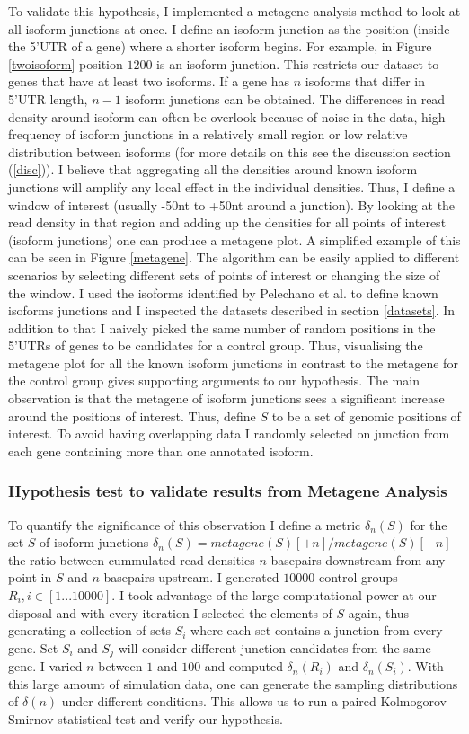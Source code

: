 \documentclass[12pt]{article}
\begin{document}
To validate this hypothesis, I implemented a metagene analysis method to look at all isoform junctions at once. I define an isoform junction as the position (inside the 5'UTR of a gene) where a shorter isoform begins. For example, in Figure \ref{twoisoform} position $1200$ is an isoform junction. This restricts our dataset to genes that have at least two isoforms. If a gene has $n$ isoforms that differ in 5'UTR length, $n - 1$ isoform junctions can be obtained. The differences in read density around isoform can often be overlook because of noise in the data, high frequency of isoform junctions in a relatively small region or low relative distribution between isoforms (for more details on this see the discussion section (\ref{disc})). I believe that aggregating all the densities around known isoform junctions will amplify any local effect in the individual densities. Thus, I define a window of interest (usually -50nt to +50nt around a junction). By looking at the read density in that region and adding up the densities for all points of interest (isoform junctions) one can produce a metagene plot. A simplified example of this can be seen in Figure \ref{metagene}. The algorithm can be easily applied to different scenarios by selecting different sets of points of interest or changing the size of the window. 
I used the isoforms identified by Pelechano et al. \cite{Pelechano2013} to define known isoforms junctions and I inspected the datasets described in section \ref{datasets}. In addition to that I naively picked the same number of random positions in the 5'UTRs of genes to be candidates for a control group. Thus, visualising the metagene plot for all the known isoform junctions in contrast to the metagene for the control group gives supporting arguments to our hypothesis. The main observation is that the metagene of isoform junctions sees a significant increase around the positions of interest. 
Thus, define $S$ to be a set of genomic positions of interest. To avoid having overlapping data I randomly selected on junction from each gene containing more than one annotated isoform.  
\subsubsection{Hypothesis test to validate results from Metagene Analysis} \label{ks_test}
To quantify the significance of this observation I define a metric $\delta_n(S)$ for the set $S$ of isoform junctions $\delta_n(S) = metagene(S)[+n] / metagene(S)[-n]$ - the ratio between cummulated read densities $n$ basepairs downstream from any point in $S$ and $n$ basepairs upstream. I generated $10000$ control groups $R_i, i \in [1...10000]$. I took advantage of the large computational power at our disposal and with every iteration I selected the elements of $S$ again, thus generating a collection of sets $S_i$ where each set contains a junction from every gene. Set $S_i$ and $S_j$ will consider different junction candidates from the same gene. I varied $n$ between $1$ and $100$ and computed $\delta_n(R_i)$ and $\delta_n(S_i)$. With this large amount of simulation data, one can generate the sampling distributions of $\delta(n)$ under different conditions. This allows us to run a paired Kolmogorov-Smirnov \cite{Massey1951} statistical test and verify our hypothesis. 
\end{document}
